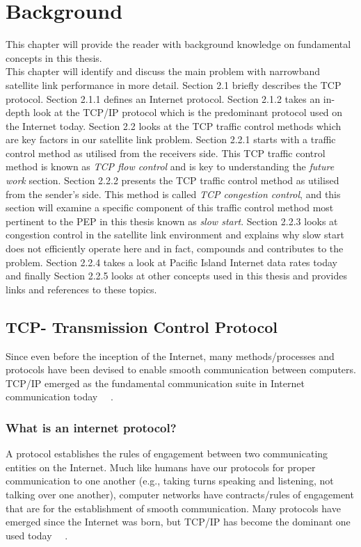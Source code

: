 
\chapter{Background}\label{Background}

This chapter will provide the reader with background knowledge on fundamental concepts in this thesis.\\

This chapter will identify and discuss the main problem with narrowband satellite link performance in more detail. Section 2.1 briefly describes the TCP protocol. Section 2.1.1 defines an Internet protocol. Section 2.1.2 takes an in-depth look at the TCP/IP protocol which is the predominant protocol used on the Internet today. Section 2.2 looks at the TCP traffic control methods which are key factors in our satellite link problem. Section 2.2.1 starts with a traffic control method as utilised from the receivers side. This TCP traffic control method is known as \emph{TCP flow control} and is key to understanding the \emph{future work} section. Section 2.2.2 presents the TCP traffic control method as utilised from the sender's side. This method is called \emph{TCP congestion control}, and this section will examine a specific component of this traffic control method most pertinent to the PEP in this thesis known as \emph{slow start}. Section 2.2.3 looks at congestion control in the satellite link environment and explains why slow start does not efficiently operate here and in fact, compounds and contributes to the problem. Section 2.2.4 takes a look at Pacific Island Internet data rates today and finally Section 2.2.5 looks at other concepts used in this thesis and provides links and references to these topics.

\section{TCP- Transmission Control Protocol}\label{TCP}
Since even before the inception of the Internet, many methods/processes and protocols have been devised to enable smooth communication between computers.  TCP/IP emerged as the fundamental communication suite in Internet communication today ~\cite{1}~\cite{2}.\\

\subsection{What is an internet protocol?}
A protocol establishes the rules of engagement between two communicating entities on the Internet. Much like humans have our protocols for proper communication to one another (e.g., taking turns speaking and listening, not talking over one another), computer networks have contracts/rules of engagement that are for the establishment of smooth communication. Many protocols have emerged since the Internet was born, but TCP/IP has become the dominant one used today ~\cite{1}~\cite{2}.

